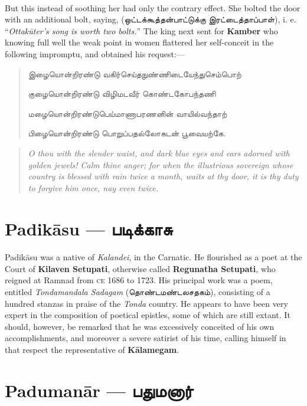 \documentclass{article}
\newcommand{\TamilText}[1]{\texttamil{#1}}
\newcommand{\TamilBold}[1]{\texttamil{\textbf{#1}}}
\newcommand{\tam}[1]{\TamilText{#1}}
\newcommand{\tambold}[1]{\TamilBold{#1}}
\begin{document}
\paragraph{}
But this instead of soothing her had only the contrary effect. She bolted the door with an additional bolt, saying, (\tam{ஒட்டக்கூத்தன்பாட்டுக்கு இரட்டைத்தாப்பாள்}), i. e. ``\emph{Ottak\={u}ter's song is worth two bolts.}'' The king next sent for \textbf{Kamber} who knowing full well the weak point in women flattered her self-conceit in the following impromptu, and obtained his request:---
\begin{quotation}\small
\tam{இழையொன்றிரண்டு வகிர்செய்தநுண்ணிடையேந்துசெம்பொற்‌}

\tam{குழையொன்றிரண்டு விழிமடவீர்‌ கொண்டகோபந்தணி}

\tam{மழையொன்றிரண்டுபெய்மாணாபரணனின்‌ வாயில்வந்தாற்‌}

\tam{பிழையொன்றிரண்டு பொறுப்பதல்லோகடன்‌ பூவையற்கே}.
\end{quotation}
\begin{quotation}\small
\emph{O thou with the slender waist, and dark blue eyes and ears adorned with golden jewels! Calm thine anger; for when the illustrious sovereign whose country is blessed with rain twice a month, waits at thy door, it is thy duty to forgive him once, nay even twice.}
\end{quotation}

\section{Padik\={a}su --- \tambold{படிக்காசு}}
\paragraph{}
Padik\={a}su was a native of \emph{Kalandei}, in the Carnatic. He flourished as a poet at the Court of \textbf{Kilaven Setupati}, otherwise called \textbf{Regunatha Setupati}, who reigned at Ramnad from \textsc{ce} 1686 to 1723. His principal work was a poem, entitled \emph{Tondamandala Sadagam} (\tam{தொண்டமண்டலசதகம்}), consisting of a hundred stanzas in praise of the \emph{Tonda} country. He appears to have been very expert in the composition of poetical epistles, some of which are still extant. It should, however, be remarked that he was excessively conceited of his own accomplishments, and moreover a severe satirist of his time, calling himself in that respect the representative of \textbf{K\={a}lamegam}.

\section{Paduman\={a}r --- \tambold{பதுமனார்}}
\end{document}
